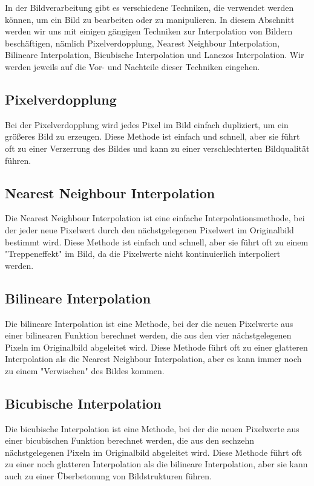 In der Bildverarbeitung gibt es verschiedene Techniken, die verwendet werden können, um ein Bild zu bearbeiten oder zu manipulieren. 
In diesem Abschnitt werden wir uns mit einigen gängigen Techniken zur Interpolation von Bildern beschäftigen, nämlich Pixelverdopplung, Nearest Neighbour Interpolation, Bilineare Interpolation, Bicubische Interpolation und Lanczos Interpolation. 
Wir werden jeweils auf die Vor- und Nachteile dieser Techniken eingehen.

\subsection{Pixelverdopplung}

Bei der Pixelverdopplung wird jedes Pixel im Bild einfach dupliziert, um ein größeres Bild zu erzeugen. 
Diese Methode ist einfach und schnell, aber sie führt oft zu einer Verzerrung des Bildes und kann zu einer verschlechterten Bildqualität führen.

\subsection{Nearest Neighbour Interpolation}

Die Nearest Neighbour Interpolation ist eine einfache Interpolationsmethode, bei der jeder neue Pixelwert durch den nächstgelegenen Pixelwert im Originalbild bestimmt wird. 
Diese Methode ist einfach und schnell, aber sie führt oft zu einem "Treppeneffekt" im Bild, da die Pixelwerte nicht kontinuierlich interpoliert werden.

\subsection{Bilineare Interpolation}

Die bilineare Interpolation ist eine Methode, bei der die neuen Pixelwerte aus einer bilinearen Funktion berechnet werden, die aus den vier nächstgelegenen Pixeln im Originalbild abgeleitet wird. 
Diese Methode führt oft zu einer glatteren Interpolation als die Nearest Neighbour Interpolation, aber es kann immer noch zu einem "Verwischen" des Bildes kommen.

\subsection{Bicubische Interpolation}

Die bicubische Interpolation ist eine Methode, bei der die neuen Pixelwerte aus einer bicubischen Funktion berechnet werden, die aus den sechzehn nächstgelegenen Pixeln im Originalbild abgeleitet wird.
Diese Methode führt oft zu einer noch glatteren Interpolation als die bilineare Interpolation, aber sie kann auch zu einer Überbetonung von Bildstrukturen führen.

